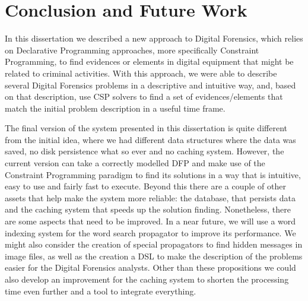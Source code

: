 \chapter{Conclusion and Future Work}

In this dissertation we described a new approach to Digital Forensics, which relies on Declarative Programming approaches, more specifically Constraint Programming, to find evidences or elements in digital equipment that might be related to criminal activities. With this approach, we were able to describe several Digital Forensics problems in a descriptive and intuitive way, and, based on that description, use CSP solvers to find a set of evidences/elements that match the initial problem description in a useful time frame.

The final version of the system presented in this dissertation is quite different from the initial idea, where we had different data structures where the data was saved, no disk persistence what so ever and no caching system. However, the current version can take a correctly modelled \ac{DFP} and make use of the Constraint Programming paradigm to find its solutions in a way that is intuitive, easy to use and fairly fast to execute. Beyond this there are a couple of other assets that help make the system more reliable: the database, that persists data and the caching system that speeds up the solution finding. 
Nonetheless, there are some aspects that need to be improved. In a near future, we will use a word indexing system for the word search propagator to improve its performance. We might also consider the creation of special propagators to find hidden messages in image files, as well as the creation a \acf{DSL} to make the description of the problems easier for the Digital Forensics analysts. Other than these propositions we could also develop an improvement for the caching system to shorten the processing time even further and a tool to integrate everything.